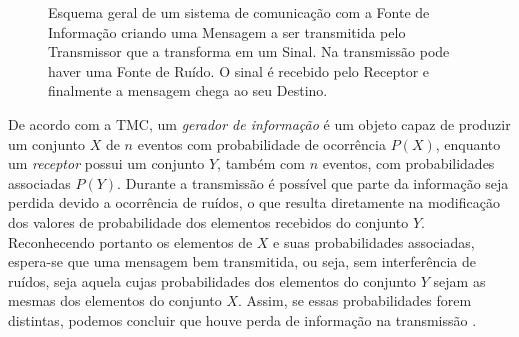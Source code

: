 \begin{figure}[ht!]
  \centering
  \caption{Esquema geral de um sistema de comunicação com a Fonte de Informação criando uma Mensagem a ser transmitida pelo Transmissor que a transforma em um Sinal. Na transmissão pode haver uma Fonte de Ruído. O sinal é recebido pelo Receptor e finalmente a mensagem chega ao seu Destino.}\label{comunicshannon}
\end{figure}

De acordo com  a TMC, um \textit{gerador de informação} é um objeto capaz de produzir um conjunto $X$ de $n$ eventos com probabilidade de ocorrência $P(X)$, enquanto um \textit{receptor} possui um conjunto $Y$, também com $n$ eventos, com probabilidades associadas $P(Y)$. Durante a transmissão é possível que parte da informação seja perdida devido a ocorrência de ruídos, o que resulta diretamente na modificação dos valores de probabilidade dos elementos recebidos do conjunto $Y$. Reconhecendo portanto os elementos de $X$ e suas probabilidades associadas, espera-se que uma mensagem bem transmitida, ou seja, sem interferência de ruídos, seja aquela cujas probabilidades dos elementos do conjunto $Y$ sejam as mesmas dos elementos do conjunto $X$. Assim, se essas probabilidades forem distintas, podemos concluir que houve perda de informação na transmissão \cite{mathematical}.

